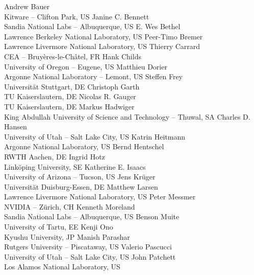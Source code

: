\documentclass[a4paper,UKenglish]{dagrep}
\begin{document}
\begin{participants}
\participant Andrew Bauer \\ Kitware – Clifton Park, US
\participant Janine C. Bennett \\Sandia National Labs – Albuquerque, US
\participant E. Wes Bethel \\Lawrence Berkeley National Laboratory, US
\participant Peer-Timo Bremer \\ Lawrence Livermore National Laboratory, US
\participant Thierry Carrard \\ CEA – Bruyères-le-Châtel, FR
\participant Hank Childs \\ University of Oregon – Eugene, US
\participant Matthieu Dorier \\ Argonne National Laboratory – Lemont, US
\participant Steffen Frey \\ Universität Stuttgart, DE
\participant Christoph Garth \\ TU Kaiserslautern, DE 
\participant Nicolas R. Gauger \\ TU Kaiserslautern, DE
\participant Markus Hadwiger \\ King Abdullah University of Science and Technology – Thuwal, SA
\participant Charles D. Hansen \\ University of Utah – Salt Lake City, US
\participant Katrin Heitmann \\ Argonne National Laboratory, US
\participant Bernd Hentschel \\ RWTH Aachen, DE
\participant Ingrid Hotz \\ Linköping University, SE
\participant Katherine E. Isaacs \\ University of Arizona – Tucson, US
\participant Jens Krüger \\ Universität Duisburg-Essen, DE
\participant Matthew Larsen \\ Lawrence Livermore National Laboratory, US
\participant Peter Messmer \\ NVIDIA – Zürich, CH
\participant Kenneth Moreland \\ Sandia National Labs – Albuquerque, US
\participant Benson Muite \\ University of Tartu, EE
\participant Kenji Ono \\ Kyushu University, JP
\participant Manish Parashar \\ Rutgers University – Piscataway, US
\participant Valerio Pascucci \\ University of Utah – Salt Lake City, US
\participant John Patchett \\ Los Alamos National Laboratory, US

\end{participants}
\end{document}
